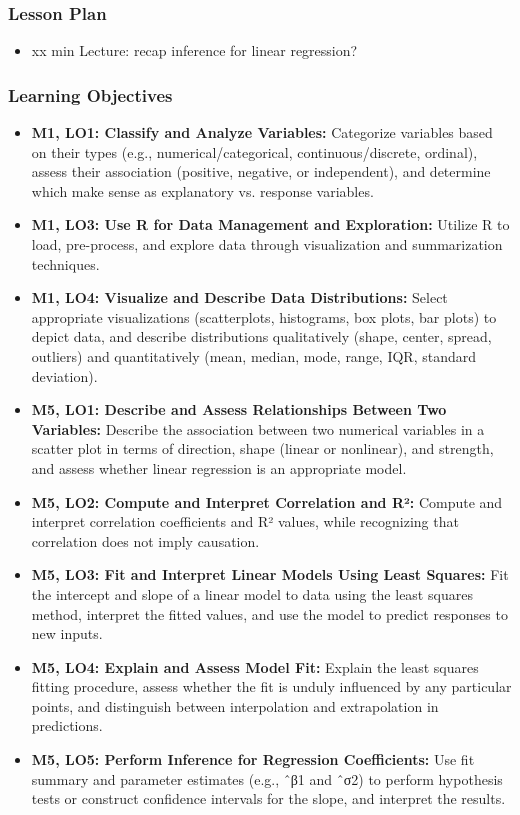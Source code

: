 \begin{frame}
    \frametitle{Lesson Plan}
    \begin{itemize}
        \item xx min Lecture: recap inference for linear regression?
    \end{itemize}
\end{frame}

\begin{frame}
    \frametitle{Learning Objectives}
    \begin{itemize}
        \item \textbf{M1, LO1: Classify and Analyze Variables:} Categorize variables based on their types (e.g., numerical/categorical, continuous/discrete, ordinal), assess their association (positive, negative, or independent), and determine which make sense as explanatory vs. response variables.
        \item \textbf{M1, LO3: Use R for Data Management and Exploration:} Utilize R to load, pre-process, and explore data through visualization and summarization techniques.
        \item \textbf{M1, LO4: Visualize and Describe Data Distributions:} Select appropriate visualizations (scatterplots, histograms, box plots, bar plots) to depict data, and describe distributions qualitatively (shape, center, spread, outliers) and quantitatively (mean, median, mode, range, IQR, standard deviation).
        \item \textbf{M5, LO1: Describe and Assess Relationships Between Two Variables:} Describe the association between two numerical variables in a scatter plot in terms of direction, shape (linear or nonlinear), and strength, and assess whether linear regression is an appropriate model.    
        \item \textbf{M5, LO2: Compute and Interpret Correlation and R²:} Compute and interpret correlation coefficients and R² values, while recognizing that correlation does not imply causation. 
        \item \textbf{M5, LO3: Fit and Interpret Linear Models Using Least Squares:} Fit the intercept and slope of a linear model to data using the least squares method, interpret the fitted values, and use the model to predict responses to new inputs.
        \item \textbf{M5, LO4: Explain and Assess Model Fit:} Explain the least squares fitting procedure, assess whether the fit is unduly influenced by any particular points, and distinguish between interpolation and extrapolation in predictions.
        \item \textbf{M5, LO5: Perform Inference for Regression Coefficients:} Use fit summary and parameter estimates (e.g., ˆβ1 and ˆσ2) to perform hypothesis tests or construct confidence intervals for the slope, and interpret the results.
    \end{itemize}
\end{frame}
    
